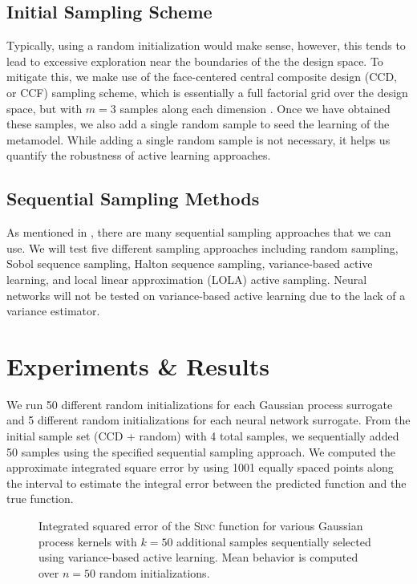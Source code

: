 \documentclass[conference]{IEEEtran}
\begin{document}
	\subsection{Initial Sampling Scheme}
	
	Typically, using a random initialization would make sense, however, this tends to lead to excessive exploration near the boundaries of the the design space. To mitigate this, we make use of the face-centered central composite design (CCD, or CCF) sampling scheme, which is essentially a full factorial grid over the design space, but with $m=3$ samples along each dimension \cite{CentralCCD}. Once we have obtained these samples, we also add a single random sample to seed the learning of the metamodel. While adding a single random sample is not necessary, it helps us quantify the robustness of active learning approaches.
	
	\subsection{Sequential Sampling Methods}
	
	As mentioned in , there are many sequential sampling approaches that we can use. We will test five different sampling approaches including random sampling, Sobol sequence sampling, Halton sequence sampling, variance-based active learning, and local linear approximation (LOLA) active sampling. Neural networks will not be tested on variance-based active learning due to the lack of a variance estimator.
	    
	\section{Experiments \& Results}
	\label{sec:experiments-results}
	
	We run 50 different random initializations for each Gaussian process surrogate and 5 different random initializations for each neural network surrogate. From the initial sample set (CCD + random) with 4 total samples, we sequentially added 50 samples using the specified sequential sampling approach. We computed the approximate integrated square error by using 1001 equally spaced points along the interval to estimate the integral error between the predicted function and the true function.
	
	\begin{figure}[bp]
		\centering
		\vspace*{-1em}
		
		\caption{Integrated squared error of the \textsc{Sinc} function for various Gaussian process kernels with $k=50$ additional samples sequentially selected using variance-based active learning. Mean behavior is computed over $n=50$ random initializations.}
		\label{fig:gp_var}
	\end{figure}
	
\end{document}
